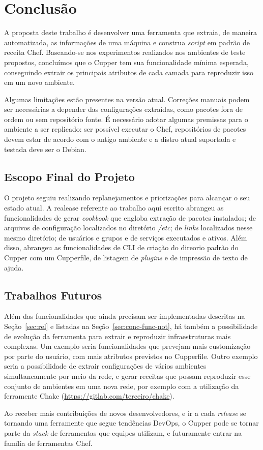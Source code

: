 \newpage\null\thispagestyle{empty}\newpage
\chapter{Conclusão}
\label{chap:conclusao}

A proposta deste trabalho é desenvolver uma ferramenta que extraia, de maneira
automatizada, as informações de uma máquina e construa \textit{script} em padrão
de receita Chef. Baseando-se nos experimentos realizados nos ambientes de teste propostos,
concluímos que o Cupper tem sua funcionalidade mínima esperada, conseguindo
extrair os principais atributos de cada camada para reproduzir isso em um novo ambiente.

Algumas limitações estão presentes na versão atual. Correções manuais podem ser necessárias
a depender das configurações extraídas, como pacotes fora de ordem ou sem repositório fonte.
É necessário adotar algumas premissas para o ambiente a ser replicado: ser possível executar
o Chef, repositórios de pacotes devem estar de acordo com o antigo ambiente e a distro atual
suportada e testada deve ser o Debian.

\section{Escopo Final do Projeto}

O projeto seguiu realizando replanejamentos e priorizações para alcançar o seu estado atual.
A realease referente ao trabalho aqui escrito abrangeu as funcionalidades de gerar 
\textit{cookbook} que engloba extração de pacotes instalados; de arquivos de configuração 
localizados no diretório \textit{/etc}; de \textit{links} localizados nesse mesmo diretório; 
de usuários e grupos e de serviços executados e ativos. Além disso, abrangeu as 
funcionalidades de CLI de criação do direorio padrão do Cupper com um Cupperfile, de listagem
de \textit{plugins} e de impressão de texto de ajuda.

\section{Trabalhos Futuros}

Além das funcionalidades que ainda precisam ser implementadas descritas na Seção~\ref{sec:rel} e
listadas na Seção~\ref{sec:conc-func-not}, há também a possibilidade de evolução da ferramenta para
extrair e reproduzir infraestruturas mais complexas. Um exemplo seria funcionalidades que 
prevejam mais customização por parte do usuário, com mais atributos previstos no Cupperfile.
Outro exemplo seria a possibilidade de extrair configurações de vários ambientes simultaneamente
por meio da rede, e gerar receitas que possam reproduzir esse
conjunto de ambientes em uma nova rede, por exemplo com a utilização da ferramente Chake (\url{https://gitlab.com/terceiro/chake}).

Ao receber mais contribuições de novos desenvolvedores, e ir a cada \textit{release} se tornando
uma ferramente que segue tendências DevOps, o Cupper pode se tornar parte da \textit{stack} de ferramentas
que equipes utilizam, e futuramente entrar na família de ferramentas Chef.
